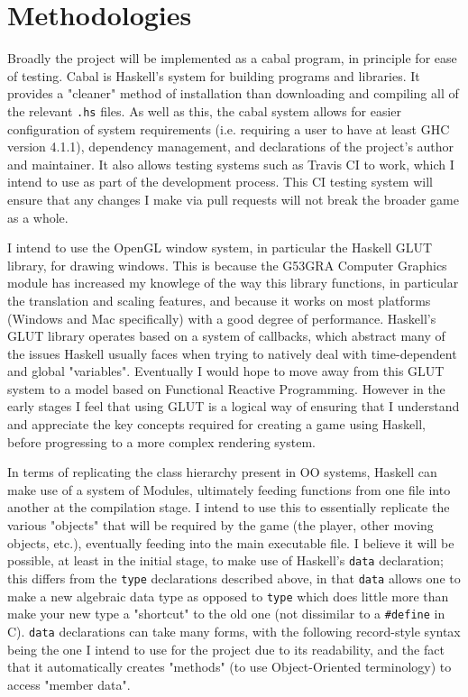 \documentclass[12pt, a4paper]{report}
\begin{document}
\section{Methodologies}
Broadly the project will be implemented as a cabal program, in principle for ease of testing.
Cabal is Haskell's system for building programs and libraries\cite{cabal}.
It provides a "cleaner" method of installation than downloading and compiling all of the relevant \verb|.hs| files.
As well as this, the cabal system allows for easier configuration of system requirements (i.e. requiring a user to have at least GHC version 4.1.1), dependency management, and declarations of the project's author and maintainer.
It also allows testing systems such as Travis CI to work\cite{travisci}, which I intend to use as part of the development process.
This CI testing system will ensure that any changes I make via pull requests will not break the broader game as a whole.

\par

I intend to use the OpenGL window system, in particular the Haskell GLUT library, for drawing windows.
This is because the G53GRA Computer Graphics module has increased my knowlege of the way this library functions, in particular the translation and scaling features, and because it works on most platforms (Windows and Mac specifically) with a good degree of performance.
Haskell's GLUT library operates based on a system of callbacks\cite{glutpage}, which abstract many of the issues Haskell usually faces when trying to natively deal with time-dependent and global "variables".
Eventually I would hope to move away from this GLUT system to a model based on Functional Reactive Programming.
However in the early stages I feel that using GLUT is a logical way of ensuring that I understand and appreciate the key concepts required for creating a game using Haskell, before progressing to a more complex rendering system.

\par

In terms of replicating the class hierarchy present in OO systems, Haskell can make use of a system of Modules, ultimately feeding functions from one file into another at the compilation stage.
I intend to use this to essentially replicate the various "objects" that will be required by the game (the player, other moving objects, etc.), eventually feeding into the main executable file.
I believe it will be possible, at least in the initial stage, to make use of Haskell's \verb|data| declaration; this differs from the \verb|type| declarations described above, in that \verb|data| allows one to make a new algebraic data type as opposed to \verb|type| which does little more than make your new type a "shortcut" to the old one (not dissimilar to a \verb|#define| in C).
\verb|data| declarations can take many forms, with the following record-style syntax being the one I intend to use for the project due to its readability, and the fact that it automatically creates "methods" (to use Object-Oriented terminology) to access "member data".
\end{document}
